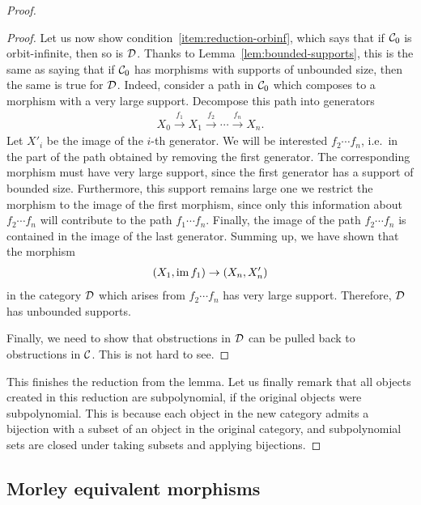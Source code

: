 \begin{proof}
\begin{proof}
    Let us now show condition~\ref{item:reduction-orbinf}, which says that if ${\mathcal C}_0$ is orbit-infinite, then so is ${\mathcal D}$. Thanks to Lemma~\ref{lem:bounded-supports}, this is the same as saying that if ${\mathcal C}_0$ has morphisms with supports of unbounded size, then the same is true for ${\mathcal D}$. Indeed, consider a path in ${\mathcal C}_0$ which composes to a morphism with a very large support. Decompose this path into generators
    \begin{align*}
    X_0 \stackrel {f_1} \longrightarrow 
    X_1 \stackrel {f_2} \longrightarrow
    \cdots 
     \stackrel {f_n} \longrightarrow X_n.
    \end{align*}
    Let $X'_i$ be the image of the $i$-th generator.
    We will be interested  $f_2 \cdots f_n$, i.e.~in the part of the path obtained by removing the first generator. The corresponding morphism must have very large support, since the first generator has a support of bounded size. Furthermore, this support remains large one we restrict the morphism to the image of the first morphism, since only this information about $f_2 \cdots f_n$ will contribute to the path $f_1 \cdots f_n$.  Finally, the image of the path $f_2 \cdots f_n$ is contained in the image of the last generator. Summing up, we have shown that the morphism
    \begin{align*}
    (X_1, \operatorname{\mathrm{im}} f_1)\to (X_n,X'_n)
    \end{align*}
    in the category ${\mathcal D}$ which arises from $f_2 \cdots f_n$ has very large support. Therefore, ${\mathcal D}$ has unbounded supports. 

    Finally, we need to show that obstructions in ${\mathcal D}$ can be pulled back to obstructions in ${\mathcal C}$. This is not hard to see. 
\end{proof}

This finishes the reduction from the lemma. Let us finally remark that all objects created in this reduction are subpolynomial, if the original objects were subpolynomial. This is because each object in the new category admits a bijection with a subset of an object in the original category, and subpolynomial sets are closed under taking subsets and applying bijections.
\end{proof}



\subsection{Morley equivalent morphisms}
\label{sec:morely-equivalent-morphisms}

